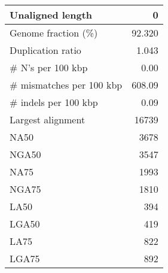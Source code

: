 \documentclass[12pt,a4paper]{article}
\begin{document}
\begin{table}[ht]
\begin{center}
\begin{tabular}{|l*{1}{|r}|}
Unaligned length & 0 \\ \hline
Genome fraction (\%) & 92.320 \\ \hline
Duplication ratio & 1.043 \\ \hline
\# N's per 100 kbp & 0.00 \\ \hline
\# mismatches per 100 kbp & 608.09 \\ \hline
\# indels per 100 kbp & 0.09 \\ \hline
Largest alignment & 16739 \\ \hline
NA50 & 3678 \\ \hline
NGA50 & 3547 \\ \hline
NA75 & 1993 \\ \hline
NGA75 & 1810 \\ \hline
LA50 & 394 \\ \hline
LGA50 & 419 \\ \hline
LA75 & 822 \\ \hline
LGA75 & 892 \\ \hline
\end{tabular}
\end{center}
\end{table}
\end{document}
